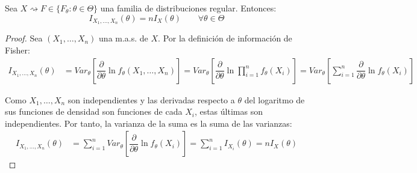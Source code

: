 \begin{prop}
    Sea $X\rightsquigarrow F \in \{F_\theta : \theta \in \Theta\}$ una familia de distribuciones regular. Entonces:
    \begin{equation*}
        I_{X_1, \ldots, X_n}(\theta) = n I_X(\theta)\qquad \forall \theta \in \Theta
    \end{equation*}
    \begin{proof}
        Sea $(X_1, \ldots, X_n)$ una m.a.s. de $X$. Por la definición de información de Fisher:
        \begin{align*}
            I_{X_1, \ldots, X_n}(\theta) &= Var_\theta\left[\dfrac{\partial}{\partial\theta} \ln f_\theta(X_1, \ldots, X_n)\right]
            = Var_\theta\left[\dfrac{\partial}{\partial\theta} \ln \prod_{i=1}^{n} f_\theta(X_i)\right]
            = Var_\theta\left[\sum_{i=1}^{n} \dfrac{\partial}{\partial\theta} \ln f_\theta(X_i)\right]
        \end{align*}

        Como $X_1, \ldots, X_n$ son independientes y las derivadas respecto a $\theta$ del logaritmo de sus funciones de densidad son funciones de cada $X_i$, estas últimas son independientes. Por tanto, la varianza de la suma es la suma de las varianzas:
        \begin{align*}
            I_{X_1, \ldots, X_n}(\theta) &= \sum_{i=1}^{n} Var_\theta\left[\dfrac{\partial}{\partial\theta} \ln f_\theta(X_i)\right] = \sum_{i=1}^{n} I_{X_i}(\theta) = n I_X(\theta)
        \end{align*}
    \end{proof}
\end{prop}


